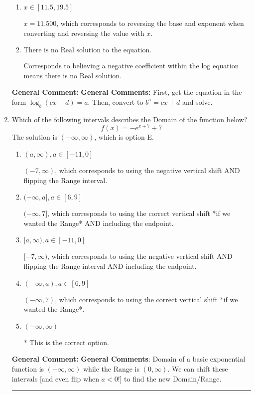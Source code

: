 \documentclass{extbook}[14pt]
\newcommand{\litem}[1]{\item #1

\rule{\textwidth}{0.4pt}}
\begin{document}
\begin{enumerate}
{\begin{enumerate}[label=\Alph*.]
* $x = -3.469$, which is the correct option.
\item \( x \in [11.5, 19.5] \)

$x = 11.500$, which corresponds to reversing the base and exponent when converting and reversing the value with $x$.
\item \( \text{There is no Real solution to the equation.} \)

Corresponds to believing a negative coefficient within the log equation means there is no Real solution.
\end{enumerate}

\textbf{General Comment:} \textbf{General Comments:} First, get the equation in the form $\log_b{(cx+d)} = a$. Then, convert to $b^a = cx+d$ and solve.
}
\litem{
Which of the following intervals describes the Domain of the function below?
\[ f(x) = -e^{x+7}+7 \]The solution is \( (-\infty, \infty) \), which is option E.\begin{enumerate}[label=\Alph*.]
\item \( (a, \infty), a \in [-11, 0] \)

$(-7, \infty)$, which corresponds to using the negative vertical shift AND flipping the Range interval.
\item \( (-\infty, a], a \in [6, 9] \)

$(-\infty, 7]$, which corresponds to using the correct vertical shift *if we wanted the Range* AND including the endpoint.
\item \( [a, \infty), a \in [-11, 0] \)

$[-7, \infty)$, which corresponds to using the negative vertical shift AND flipping the Range interval AND including the endpoint.
\item \( (-\infty, a), a \in [6, 9] \)

$(-\infty, 7)$, which corresponds to using the correct vertical shift *if we wanted the Range*.
\item \( (-\infty, \infty) \)

* This is the correct option.
\end{enumerate}

\textbf{General Comment:} \textbf{General Comments}: Domain of a basic exponential function is $(-\infty, \infty)$ while the Range is $(0, \infty)$. We can shift these intervals [and even flip when $a<0$!] to find the new Domain/Range.
}
\end{enumerate}
\end{document}
